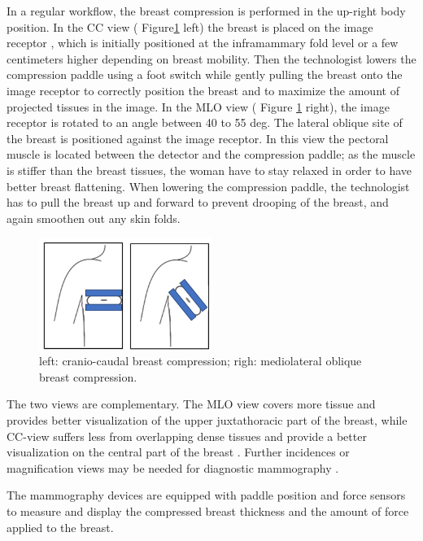 In a regular workflow, the breast compression is performed in the up-right body position. In the CC view ( Figure\ref{fig:cc_mlo_view} left) the breast is placed on the image receptor , which is initially positioned at the inframammary fold level or a few centimeters higher depending on breast mobility. Then the technologist lowers the compression paddle using a foot switch while gently pulling the breast onto the image receptor to correctly position the breast and to maximize the amount of projected tissues in the image. In the MLO view ( Figure \ref{fig:cc_mlo_view} right), the image receptor is rotated to an angle between 40 to 55 deg. The lateral oblique site of the breast is positioned against the image receptor. In this view the pectoral muscle is located between the detector and the compression paddle; as the muscle is stiffer than the breast tissues, the woman have to stay relaxed in order to have better breast flattening. When lowering the compression paddle, the technologist has to pull the breast up and forward to prevent drooping of the breast, and again smoothen out any skin folds. 


\begin{figure}[!h]
\centering
\includegraphics[width=0.5\textwidth,keepaspectratio]{figures/cc_mlo_view.jpg} 
\caption{left: cranio-caudal breast compression; righ: mediolateral oblique breast compression. }
\label{fig:cc_mlo_view}
\end{figure}

 The two views are complementary. The MLO view covers more tissue and provides better visualization of the upper juxtathoracic part of the breast, while CC-view suffers less from overlapping dense tissues and provide a better visualization on the central part of the breast \citep{chan_image_1987,kim_computer_2006}.  Further incidences or magnification views may be needed for diagnostic mammography \citep{groot_towards_2015}.
 

The mammography devices are equipped with paddle position and force sensors to measure and display the compressed breast thickness and the amount of force applied to the breast.

